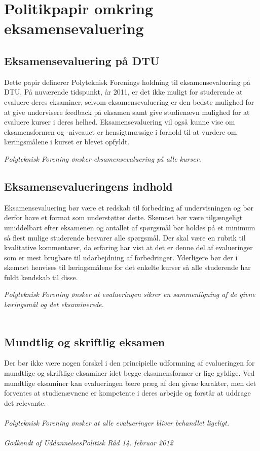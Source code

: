 \section{Politikpapir omkring eksamensevaluering}

\subsection{Eksamensevaluering på DTU}
Dette papir definerer Polyteknisk Forenings holdning til eksamensevaluering på DTU.
På nuværende tidspunkt, år 2011, er det ikke muligt for studerende at evaluere deres eksaminer, selvom eksamensevaluering er den bedste mulighed for at give undervisere feedback på eksamen samt give studienævn mulighed for at evaluere kurser i deres helhed. Eksamensevaluering vil også kunne vise om eksamensformen og -niveauet er hensigtmæssige i forhold til at vurdere om læringsmålene i kurset er blevet opfyldt.

\textsl{Polyteknisk Forening ønsker eksamensevaluering på alle kurser.}

\subsection{Eksamensevalueringens indhold}
Eksamensevaluering bør være et redskab til forbedring af undervisningen og bør derfor have et format som understøtter dette. Skemaet bør være tilgængeligt umiddelbart efter eksamenen og antallet af spørgsmål bør holdes på et minimum så flest mulige studerende besvarer alle spørgsmål. Der skal være en rubrik til kvalitative kommentarer, da erfaring har vist at det er denne del af evalueringer som er mest brugbare til udarbejdning af forbedringer. Yderligere bør der i skemaet henvises til læringsmålene for det enkelte kurser så alle studerende har fuldt kendskab til disse.

\textsl{Polyteknisk Forening ønsker at evalueringen sikrer en sammenligning af de givne læringsmål og det eksaminerede.}
\\
\\
\subsection{Mundtlig og skriftlig eksamen}
Der bør ikke være nogen forskel i den principielle udformning af evalueringen for mundtlige og skriftlige eksaminer idet begge eksamensformer er lige gyldige. Ved mundtlige eksaminer kan evalueringen bære præg af den givne karakter, men det forventes at studienævnene er kompetente i deres arbejde og forstår at uddrage det relevante.
\\
\\
\textsl{Polyteknisk Forening ønsker at alle evalueringer bliver behandlet ligeligt.}
\\
\\
\textit{Godkendt af UddannelsesPolitisk Råd 14. februar 2012}